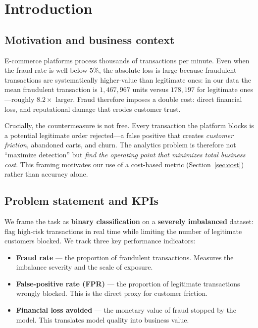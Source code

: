 \documentclass{article}
\begin{document}
\section{Introduction}
\label{sec:intro}

\subsection{Motivation and business context}
E-commerce platforms process thousands of transactions per minute.
Even when the fraud rate is well below $5\%$, the absolute loss is
large because fraudulent transactions are systematically
higher-value than legitimate ones: in our data the mean fraudulent
transaction is $1{,}467{,}967$ units versus $178{,}197$ for legitimate
ones---roughly $8.2\times$ larger. Fraud therefore imposes a double
cost: direct financial loss, and reputational damage that erodes
customer trust.

Crucially, the countermeasure is not free. Every transaction the
platform blocks is a potential legitimate order rejected---a false
positive that creates \emph{customer friction}, abandoned carts, and
churn. The analytics problem is therefore not ``maximize detection''
but \emph{find the operating point that minimizes total business
cost}. This framing motivates our use of a cost-based metric
(Section~\ref{sec:cost}) rather than accuracy alone.

\subsection{Problem statement and KPIs}
\label{subsec:kpi}
We frame the task as \textbf{binary classification} on a
\textbf{severely imbalanced} dataset: flag high-risk transactions in
real time while limiting the number of legitimate customers blocked.
We track three key performance indicators:

\begin{itemize}
    \item \textbf{Fraud rate} --- the proportion of fraudulent
    transactions. Measures the imbalance severity and the scale of
    exposure.
    \item \textbf{False-positive rate (FPR)} --- the proportion of
    legitimate transactions wrongly blocked. This is the direct proxy
    for customer friction.
    \item \textbf{Financial loss avoided} --- the monetary value of
    fraud stopped by the model. This translates model quality into
    business value.
\end{itemize}
\end{document}
